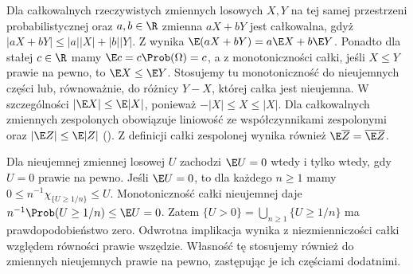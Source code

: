Dla całkowalnych rzeczywistych zmiennych losowych $X,Y$
na tej samej przestrzeni probabilistycznej oraz $a,b\in\R$ zmienna $aX+bY$
jest całkowalna, gdyż $|aX+bY|\leq |a||X|+|b||Y|$.
Z 
wynika $\E(aX+bY)=a\E X+b\E Y$.
Ponadto dla stałej $c\in\R$ mamy $\E c=c\Prob(\Omega)=c$,
a z monotoniczności całki, jeśli $X\leq Y$ prawie na pewno,
to $\E X\leq\E Y$. Stosujemy tu monotoniczność do
nieujemnych części lub, równoważnie, do różnicy $Y-X$,
której całka jest nieujemna. W szczególności
$|\E X|\leq\E|X|$, ponieważ $-|X|\leq X\leq |X|$.
Dla całkowalnych zmiennych zespolonych obowiązuje liniowość
ze współczynnikami zespolonymi oraz $|\E Z|\leq\E|Z|$
().
Z definicji całki zespolonej wynika również
$\E\overline Z=\overline{\E Z}$.

Dla nieujemnej zmiennej losowej $U$ zachodzi $\E U=0$
wtedy i tylko wtedy, gdy $U=0$ prawie na pewno.
Jeśli $\E U=0$, to dla każdego $n\geq1$ mamy
$0\leq n^{-1}\chi_{\{U\geq 1/n\}}\leq U$.
Monotoniczność całki nieujemnej daje
$n^{-1}\Prob(U\geq1/n)\leq\E U=0$.
Zatem $\{U>0\}=\bigcup_{n\geq1}\{U\geq1/n\}$ ma
prawdopodobieństwo zero. Odwrotna implikacja wynika
z niezmienniczości całki względem równości prawie wszędzie.
Własność tę stosujemy również do zmiennych nieujemnych
prawie na pewno, zastępując je ich częściami dodatnimi.


